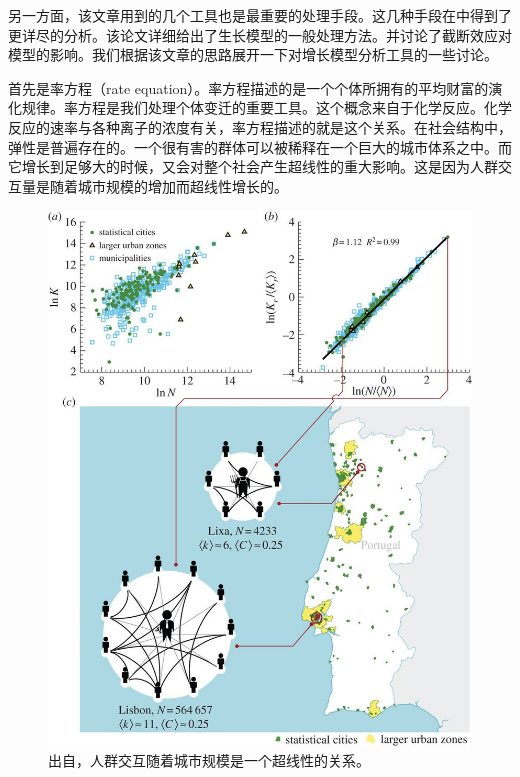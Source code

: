 另一方面，该文章用到的几个工具也是最重要的处理手段。这几种手段在\cite{Bagrow_2008}中得到了更详尽的分析。该论文详细给出了生长模型的一般处理方法。并讨论了截断效应对模型的影响。我们根据该文章的思路展开一下对增长模型分析工具的一些讨论。

首先是率方程（rate equation）。率方程描述的是一个个体所拥有的平均财富的演化规律。率方程是我们处理个体变迁的重要工具。这个概念来自于化学反应。化学反应的速率与各种离子的浓度有关，率方程描述的就是这个关系。在社会结构中，弹性\cite{gao2016universal}是普遍存在的。一个很有害的群体可以被稀释在一个巨大的城市体系之中。而它增长到足够大的时候，又会对整个社会产生超线性的重大影响\cite{schlapfer2014scaling}。这是因为人群交互量是随着城市规模的增加而超线性增长的。
\begin{figure}
    \centering
    \includegraphics[width = \linewidth]{pictures/rsif20130789f01.jpg}
    \caption{出自\cite{schlapfer2014scaling}，人群交互随着城市规模是一个超线性的关系。}
\end{figure}

